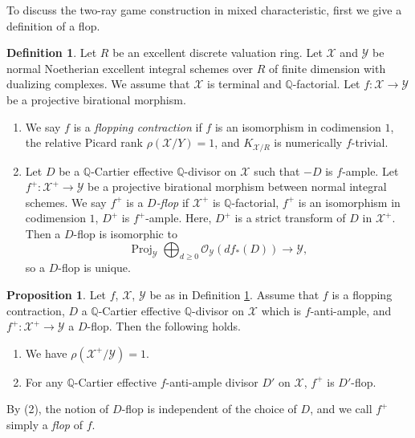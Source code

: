 \documentclass[autodetect-engine, a4paper]{amsart}
\theoremstyle{definition}
\newtheorem{prop}[thm]{Proposition}
\newtheorem{defn}[thm]{Definition}
\def\Q{{\mathbb Q}}
\def\cO{\mathcal{O}}
\DeclareMathOperator\Proj{\mathrm{Proj}}
\begin{document}
To discuss the two-ray game construction in mixed characteristic, first we give a definition of a flop.

\begin{defn}
\label{defn:flop}
Let $R$ be an excellent discrete valuation ring.
Let $\mathcal{X}$ and $\mathcal{Y}$ be normal Noetherian excellent integral schemes over $R$ of finite dimension with dualizing complexes.
We assume that $\mathcal{X}$ is terminal and $\Q$-factorial.
Let $f \colon \mathcal{X} \rightarrow \mathcal{Y}$ be a projective birational morphism.
\begin{enumerate}
\item 
We say $f$ is a \emph{flopping contraction} if $f$ is an isomorphism in codimension $1$, the relative Picard rank $\rho(\mathcal{X}/Y) =1$, and
$K_{\mathcal{X}/R}$ is numerically $f$-trivial.
\item 
Let $D$ be a $\Q$-Cartier effective $\Q$-divisor on $\mathcal{X}$ such that $-D$ is $f$-ample.
Let $f^{+} \colon \mathcal{X}^{+} \rightarrow \mathcal{Y}$ be a projective birational morphism between normal integral schemes.
We say $f^{+}$ is a \emph{$D$-flop} if $\mathcal{X}^{+}$ is $\Q$-factorial, 
$f^{+}$ is an isomorphism in codimension $1$, $D^{+}$ is $f^{+}$-ample.
Here, $D^{+}$ is a strict transform of $D$ in $\mathcal{X}^{+}$.
Then a $D$-flop is isomorphic to
\[
\Proj_{\mathcal{Y}}\bigoplus_{d\geq 0} \cO_{\mathcal{Y}} (d f_{\ast} (D)) \rightarrow \mathcal{Y},
\]
so a $D$-flop is unique.
\end{enumerate}
\end{defn}

\begin{prop}
Let $f$, $\mathcal{X}$, $\mathcal{Y}$ be as in Definition \ref{defn:flop}.
Assume that $f$ is a flopping contraction, $D$ a $\Q$-Cartier effective $\Q$-divisor on $\mathcal{X}$ which is $f$-anti-ample, and $f^{+}\colon \mathcal{X}^{+} \rightarrow \mathcal{Y}$ a $D$-flop.
Then the following holds.
\begin{enumerate}
\item
We have $\rho(\mathcal{X}^{+}/\mathcal{Y}) =1$.
\item 
For any $\Q$-Cartier effective $f$-anti-ample divisor $D'$ on $\mathcal{X}$, $f^{+}$ is $D'$-flop.
\end{enumerate}
By (2), the notion of $D$-flop is independent of the choice of $D$, and we call $f^{+}$ simply a \emph{flop} of $f$.
\end{prop}
\end{document}
